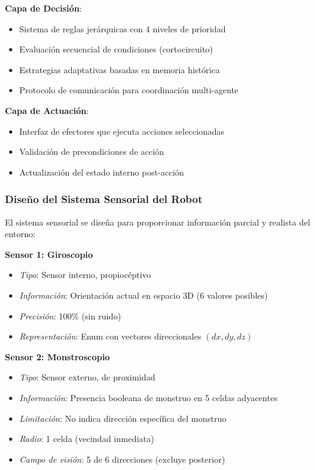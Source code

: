 \documentclass[10pt,twocolumn]{article}
\begin{document}
\textbf{Capa de Decisión}:
\begin{itemize}
\item Sistema de reglas jerárquicas con 4 niveles de prioridad
\item Evaluación secuencial de condiciones (cortocircuito)
\item Estrategias adaptativas basadas en memoria histórica
\item Protocolo de comunicación para coordinación multi-agente
\end{itemize}

\textbf{Capa de Actuación}:
\begin{itemize}
\item Interfaz de efectores que ejecuta acciones seleccionadas
\item Validación de precondiciones de acción
\item Actualización del estado interno post-acción
\end{itemize}

\subsubsection{Diseño del Sistema Sensorial del Robot}

El sistema sensorial se diseña para proporcionar información parcial y realista del entorno:

\textbf{Sensor 1: Giroscopio}
\begin{itemize}
\item \textit{Tipo}: Sensor interno, propiocéptivo
\item \textit{Información}: Orientación actual en espacio 3D (6 valores posibles)
\item \textit{Precisión}: 100\% (sin ruido)
\item \textit{Representación}: Enum con vectores direccionales $(dx, dy, dz)$
\end{itemize}

\textbf{Sensor 2: Monstroscopio}
\begin{itemize}
\item \textit{Tipo}: Sensor externo, de proximidad
\item \textit{Información}: Presencia booleana de monstruo en 5 celdas adyacentes
\item \textit{Limitación}: No indica dirección específica del monstruo
\item \textit{Radio}: 1 celda (vecindad inmediata)
\item \textit{Campo de visión}: 5 de 6 direcciones (excluye posterior)
\end{itemize}
\end{document}
